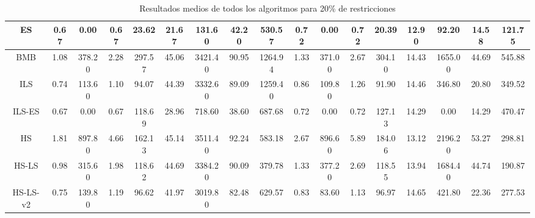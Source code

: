 \begin{table}[H]
{{\begin{tabular}{|| c || c c c c || c c c c || c c c c || c c c c ||}
        \\
        \hline \hline
        ES &
        0.67 & 0.00 & 0.67 & 23.62 & 21.67 & 131.60 & 42.20 & 530.57 & 0.72 & 0.00 & 0.72 & 20.39 & 12.90 & 92.20 & 14.58 & 121.75
        \\
        \hline
        BMB &
        1.08 & 378.20 & 2.28 & 297.57 & 45.06 & 3421.40 & 90.95 & 1264.94 & 1.33 & 371.00 & 2.67 & 304.10 & 14.43 & 1655.00 & 44.69 & 545.88
        \\
        \hline
        ILS &
        0.74 & 113.60 & 1.10 & 94.07 & 44.39 & 3332.60 & 89.09 & 1259.40 & 0.86 & 109.80 & 1.26 & 91.90 & 14.46 & 346.80 & 20.80 & 349.52
        \\
        \hline
        ILS-ES &
        0.67 & 0.00 & 0.67 & 118.69 & 28.96 & 718.60 & 38.60 & 687.68 & 0.72 & 0.00 & 0.72 & 127.13 & 14.29 & 0.00 & 14.29 & 470.47
        \\
        \hline \hline
        HS &
        1.81 & 897.80 & 4.66 & 162.13 & 45.14 & 3511.40 & 92.24 & 583.18 & 2.67 & 896.60 & 5.89 & 184.06 & 13.12 & 2196.20 & 53.27 & 298.81
        \\
        \hline
        HS-LS &
        0.98 & 315.60 & 1.98 & 118.62 & 44.69 & 3384.20 & 90.09 & 379.78 & 1.33 & 377.20 & 2.69 & 118.55 & 13.94 & 1684.40 & 44.74 & 190.87
        \\
        \hline
        HS-LS-v2 &
        0.75 & 139.80 & 1.19 & 96.62 & 41.97 & 3019.80 & 82.48 & 629.57 & 0.83 & 83.60 & 1.13 & 96.97 & 14.65 & 421.80 & 22.36 & 277.53
        \\
        \hline
    \end{tabular}
    }
    }
    \caption{Resultados medios de todos los algoritmos para 20\% de restricciones}
\end{table}

\vspace*{\fill}
\newpage




